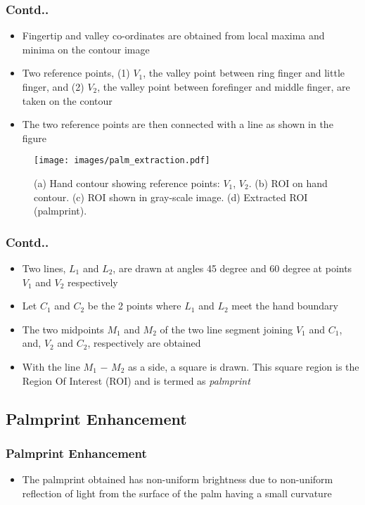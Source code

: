 \documentclass{beamer}
\begin{document}
\begin{frame}
\frametitle{Contd..}
    	\begin{itemize}
		\item Fingertip and valley co-ordinates are obtained from local maxima and minima on the contour image
		\item Two reference points, (1) $V_1$, the valley point between ring finger and little finger, and (2) $V_2$, the valley point between forefinger and middle finger, are taken on the contour
		\item The two reference points are then connected with a line as shown in the figure
  	\end{itemize}
  	
  	\begin{figure}
	\begin{center}
	\texttt{[image: images/palm\_extraction.pdf]}
	\caption{(a) Hand contour showing reference points: $V_1$, $V_2$. (b) ROI on hand contour. (c) ROI shown in gray-scale image. (d) Extracted ROI (palmprint).
\label{palm_extraction} }
	\end{center}
	\end{figure}
\end{frame}

\begin{frame}
\frametitle{Contd..}
    	\begin{itemize}
		\item Two lines, $L_1$ and $L_2$, are drawn at angles 45 degree and 60 degree at points $V_1$ and $V_2$ respectively
		\item Let $C_1$ and $C_2$ be the 2 points where  $L_1$ and $L_2$ meet the hand boundary
		\item The two midpoints  $M_1$ and $M_2$ of the two line segment joining $V_1$ and $C_1$, and, $V_2$ and $C_2$, respectively
are obtained
		\item With the 
line $M_1$ $-$ $M_2$ as a side, a square is drawn.  This square region is the Region Of Interest (ROI) and is termed as \emph{palmprint}
  	\end{itemize}
  	
\end{frame}

\subsection{Palmprint Enhancement}
\begin{frame}
 \frametitle{Palmprint Enhancement}
 \begin{itemize}
 	\item The palmprint obtained  has non-uniform brightness due to non-uniform reflection of light from the surface of the palm having a small curvature 
\end{itemize}
\end{frame}
\end{document}
